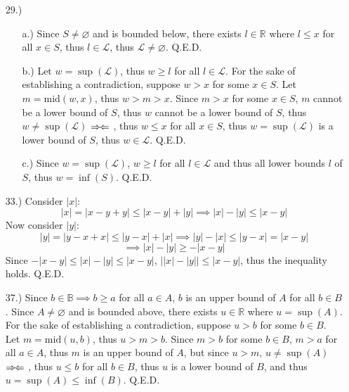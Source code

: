 \documentclass[12pt]{article}
\newcommand{\contradiction}{
    \ensuremath{{\Rightarrow\mspace{-2mu}\Leftarrow}}
}
\newcommand{\vertb}[1]{\left\vert#1\right\vert}
\begin{document}
\pagestyle{fancy}
\fancyhead{}

\normalsize
\begin{itemize}
    \item [29.)] \begin{itemize}
        \item [a.)] Since $S\ne\varnothing$ and is bounded below, there exists $l\in\mathbb{R}$ where $l\leq x$ for all $x\in S$, thus $l\in\mathscr{L}$, thus $\mathscr{L}\ne\varnothing$. Q.E.D.

        \item [b.)] Let $w=\sup(\mathscr{L})$, thus $w\geq l$ for all $l\in\mathscr{L}$. For the sake of establishing a contradiction, suppose $w>x$ for some $x\in S$. Let $m=\text{mid}(w,x)$, thus $w>m>x$. Since $m>x$ for some $x\in S$, $m$ cannot be a lower bound of $S$, thus $w$ cannot be a lower bound of $S$, thus $w\ne\sup(\mathscr{L})$\contradiction, thus $w\leq x$ for all $x\in S$, thus $w=\sup(\mathscr{L})$ is a lower bound of $S$, thus $w\in\mathscr{L}$. Q.E.D.

        \item [c.)] Since $w=\sup(\mathscr{L})$, $w\geq l$ for all $l\in\mathscr{L}$ and thus all lower bounds $l$ of $S$, thus $w=\inf(S)$. Q.E.D.
    \end{itemize}

    \item [33.)] Consider $\vertb{x}$:
    \[\vertb{x}=\vertb{x-y+y}\leq\vertb{x-y}+\vertb{y}\implies\vertb{x}-\vertb{y}\leq\vertb{x-y}\]
    Now consider $\vertb{y}$:
    \[\vertb{y}=\vertb{y-x+x}\leq\vertb{y-x}+\vertb{x}\implies\vertb{y}-\vertb{x}\leq\vertb{y-x}=\vertb{x-y}\]
    \[\implies\vertb{x}-\vertb{y}\geq-\vertb{x-y}\]
    Since $-\vertb{x-y}\leq\vertb{x}-\vertb{y}\leq\vertb{x-y}$, $\big\vert\vertb{x}-\vertb{y}\big\vert\leq\vertb{x-y}$, thus the inequality holds. Q.E.D.

    \item [37.)] Since $b\in\mathbb{B}\implies b\geq a$ for all $a\in A$, $b$ is an upper bound of $A$ for all $b\in B$. Since $A\ne\varnothing$ and is bounded above, there exists $u\in\mathbb{R}$ where $u=\sup(A)$. For the sake of establishing a contradiction, suppose $u>b$ for some $b\in B$. Let $m=\text{mid}(u,b)$, thus $u>m>b$. Since $m>b$ for some $b\in B$, $m>a$ for all $a\in A$, thus $m$ is an upper bound of $A$, but since $u>m$, $u\neq\sup(A)$\contradiction, thus $u\leq b$ for all $b\in B$, thus $u$ is a lower bound of $B$, and thus $u=\sup(A)\leq\inf(B)$. Q.E.D.


\end{itemize}
\end{document}
